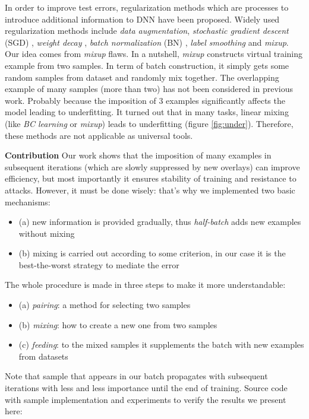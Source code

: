 \documentclass{article}
\begin{document}
In order to improve test errors, regularization methods which are processes to
introduce additional information to DNN have been proposed\cite{miyato2018virtual}. Widely
used regularization methods include \emph{data augmentation}, \emph{stochastic
	gradient descent} (SGD) \cite{zhang2016understanding}, \emph{weight decay}
\cite{krogh1992simple}, \emph{batch normalization} (BN) \cite{ioffe2015batch},
\emph{label
	smoothing}\cite{szegedy2016rethinking} and \emph{mixup}\cite{zhang2017mixup}.
Our idea comes from \emph{mixup} flaws. In a nutshell, \emph{mixup} constructs
virtual training example from two samples. In term of batch construction, it
simply gets some random samples from dataset and randomly mix together.
The overlapping example of many samples (more than two) has not been considered
in previous work. Probably because the imposition of 3 examples significantly affects the model leading to underfitting.
It turned out that in many tasks, linear mixing (like \emph{BC learning} or
\emph{mixup}) leads to underfitting (figure \ref{fig:under}). Therefore, these methods are not applicable as universal tools.

\textbf{Contribution} Our work shows that the imposition of many examples in
subsequent iterations (which are slowly suppressed by new overlays) can improve efficiency, but most importantly it ensures stability of training and resistance to attacks.
However, it must be done wisely: that's why we implemented two basic mechanisms:
\begin{itemize}
\item (a) new information is provided gradually, thus \emph{half-batch} adds
new examples without mixing
\item (b) mixing is carried out according to some criterion, in our case it is the
best-the-worst strategy to mediate the error
\end{itemize}
The whole procedure is made in three steps to make it more understandable:
\begin{itemize}
\item (a) \emph{pairing}: a method for selecting two samples
\item (b) \emph{mixing}: how to create a new one from two samples
\item (c) \emph{feeding}: to the mixed samples it supplements the batch with new examples
from datasets
\end{itemize}
Note that sample that appears in our batch propagates with
subsequent iterations with less and less importance until the end of training.
Source code with sample implementation and experiments to verify the results
we present here:
\end{document}
